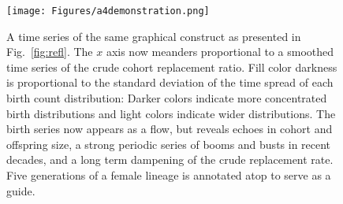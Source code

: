 \documentclass{article}
\begin{document}
\begin{figure}
\texttt{[image: Figures/a4demonstration.png]}
%
\caption{A time series of the same graphical construct as presented in Fig.~\ref{fig:refl}. The $x$ axis now meanders proportional to a smoothed time series of the crude cohort replacement ratio. Fill color darkness is proportional to the standard deviation of the time spread of each birth count distribution: Darker colors indicate more concentrated birth distributions and light colors indicate wider distributions. The birth series now appears as a flow, but reveals echoes in cohort and offspring size, a strong periodic series of booms and busts in recent decades, and a long term dampening of the crude replacement rate. Five generations of a female lineage is annotated atop to serve as a guide.}
\label{fig:foldout}
\end{figure}


\end{document}
